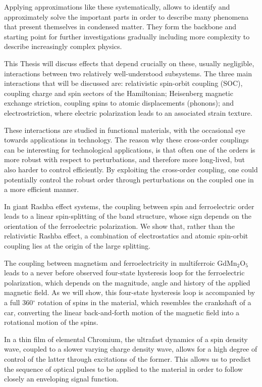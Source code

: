 \documentclass[phd, titlesmallcaps,copyrightpage,foronline]{SNSthesis}
\begin{document}
Applying approximations like these systematically, allows to identify and approximately solve the important parts in order to describe many phenomena that present themselves in condensed matter.
They form the backbone and starting point for further investigations gradually including more complexity to describe increasingly complex physics.

This Thesis will discuss effects that depend crucially on these, usually negligible, interactions between two relatively well-understood subsystems.
The three main interactions that will be discussed are: relativistic spin-orbit coupling (SOC), coupling charge and spin sectors of the Hamiltonian; Heisenberg magnetic exchange striction, coupling spins to atomic displacements (phonons); and electrostriction, where electric polarization leads to an associated strain texture.

These interactions are studied in functional materials, with the occasional eye towards applications in technology.
The reason why these cross-order couplings can be interesting for technological applications, is that often one of the orders is more robust with respect to perturbations, and therefore more long-lived, but also harder to control efficiently.
By exploiting the cross-order coupling, one could potentially control the robust order through perturbations on the coupled one in a more efficient manner.

In giant Rashba effect systems, the coupling between spin and ferroelectric order leads to a linear spin-splitting of the band structure, whose sign depends on the orientation of the ferroelectric polarization.
We show that, rather than the relativistic Rashba effect, a combination of electrostatics and atomic spin-orbit coupling lies at the origin of the large splitting.

The coupling between magnetism and ferroelectricity in multiferroic GdMn$_2$O$_5$ leads to a never before observed four-state hysteresis loop for the ferroelectric polarization, which depends on the magnitude, angle and history of the applied magnetic field.
As we will show, this four-state hysteresis loop is accompanied by a full 360$^\circ$ rotation of spins in the material, which resembles the crankshaft of a car, converting the linear back-and-forth motion of the magnetic field into a rotational motion of the spins.

In a thin film of elemental Chromium, the ultrafast dynamics of a spin density wave, coupled to a slower varying charge density wave, allows for a high degree of control of the latter through excitations of the former.
This allows us to predict the sequence of optical pulses to be applied to the material in order to follow closely an enveloping signal function.
\end{document}
